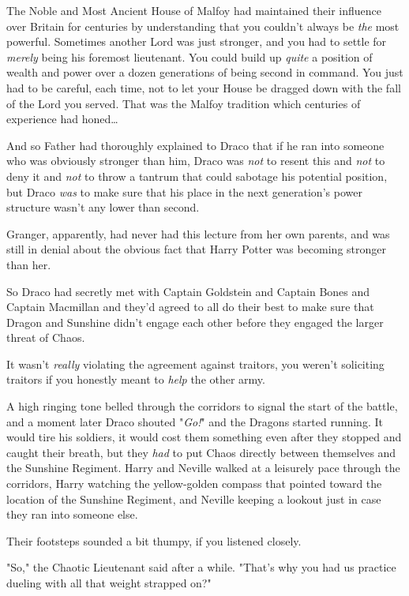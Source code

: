 The Noble and Most Ancient House of Malfoy had maintained their influence over
Britain for centuries by understanding that you couldn't always be \emph{the}
most powerful. Sometimes another Lord was just stronger, and you had to settle
for \emph{merely} being his foremost lieutenant. You could build up
\emph{quite} a position of wealth and power over a dozen generations of being
second in command. You just had to be careful, each time, not to let your House
be dragged down with the fall of the Lord you served. That was the Malfoy
tradition which centuries of experience had honed{\ldots}

And so Father had thoroughly explained to Draco that if he ran into someone who
was obviously stronger than him, Draco was \emph{not} to resent this and
\emph{not} to deny it and \emph{not} to throw a tantrum that could sabotage his
potential position, but Draco \emph{was} to make sure that his place in the
next generation's power structure wasn't any lower than second.

Granger, apparently, had never had this lecture from her own parents, and
was still in denial about the obvious fact that Harry Potter was becoming
stronger than her.

So Draco had secretly met with Captain Goldstein and Captain Bones and Captain
Macmillan and they'd agreed to all do their best to make sure that Dragon and
Sunshine didn't engage each other before they engaged the larger threat of
Chaos.

It wasn't \emph{really} violating the agreement against traitors, you weren't
soliciting traitors if you honestly meant to \emph{help} the other army.

A high ringing tone belled through the corridors to signal the start of the
battle, and a moment later Draco shouted "\emph{Go!}" and the Dragons started
running. It would tire his soldiers, it would cost them something even after
they stopped and caught their breath, but they \emph{had} to put Chaos directly
between themselves and the Sunshine Regiment.
\later
Harry and Neville walked at a leisurely pace through the corridors, Harry
watching the yellow-golden compass that pointed toward the location of the
Sunshine Regiment, and Neville keeping a lookout just in case they ran into
someone else.

Their footsteps sounded a bit thumpy, if you listened closely.

"So," the Chaotic Lieutenant said after a while. "That's why you had us
practice dueling with all that weight strapped on?"

